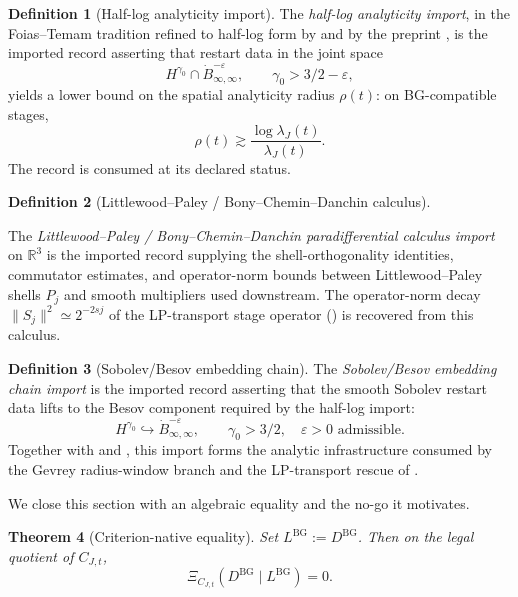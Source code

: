 \documentclass[11pt]{article}
\newcommand{\eps}{\varepsilon}
\newcommand{\DBG}{D^{\mathrm{BG}}}
\newcommand{\LBG}{L^{\mathrm{BG}}}
\newcommand{\lambdaJ}{\lambda_J}
\newcommand{\LPtr}{S_j}
\newtheorem{theorem}{Theorem}[section]
\theoremstyle{definition}
\newtheorem{definition}[theorem]{Definition}
\begin{document}
\begin{definition}[Half-log analyticity import]\label{def:ns:wang-halflog-import}
The \emph{half-log analyticity import}, in the
Foias--Temam tradition \citep{FoiasTemam1989} refined to
half-log form by \citet{HerbstSkibsted2011} and by the
preprint \citep{Wang2025AnalyticityRefined}, is the
imported record asserting that restart data in the joint
space
\[
  H^{\gamma_0}\cap\dot B^{-\eps}_{\infty,\infty},
  \qquad \gamma_0>3/2-\eps,
\]
yields a lower bound on the spatial analyticity radius
\(\rho(t)\): on BG-compatible stages,
\[
  \rho(t)\gtrsim \frac{\log\lambdaJ(t)}{\lambdaJ(t)} .
\]
The record is consumed at its declared status.
\end{definition}

\begin{definition}[Littlewood--Paley / Bony--Chemin--Danchin calculus]\label{def:ns:lp-bcd-import}\leavevmode\par\noindent
The \emph{Littlewood--Paley / Bony--Chemin--Danchin
paradifferential calculus import}
\citep{Bony1981,BahouriCheminDanchin2011} on
\(\mathbb R^3\) is the imported record supplying the
shell-orthogonality identities, commutator estimates, and
operator-norm bounds between Littlewood--Paley shells
\(P_j\) and smooth multipliers used downstream.  The
operator-norm decay
\(\|\LPtr\|^2\simeq 2^{-2sj}\) of the LP-transport stage
operator () is recovered from
this calculus.
\end{definition}

\begin{definition}[Sobolev/Besov embedding chain]\label{def:ns:sobolev-besov-embedding-import}
The \emph{Sobolev/Besov embedding chain import}
\citep{Triebel1983,BahouriCheminDanchin2011} is the
imported record asserting that the smooth Sobolev restart
data lifts to the Besov component required by the half-log
import:
\[
  H^{\gamma_0}\hookrightarrow \dot B^{-\eps}_{\infty,\infty},
  \qquad \gamma_0>3/2,\quad \eps>0\text{ admissible}.
\]
Together with  and
, this import forms the
analytic infrastructure consumed by the Gevrey
radius-window branch and the LP-transport rescue of
.
\end{definition}

We close this section with an algebraic equality and the no-go it
motivates.

\begin{theorem}[Criterion-native equality]\label{thm:ns:criterion-native-equality}
Set \(\LBG:=\DBG\).  Then on the legal quotient of \(C_{J,t}\),
\[
  \Xi_{C_{J,t}}(\DBG\mid \LBG)=0 .
\]
\end{theorem}
\end{document}

